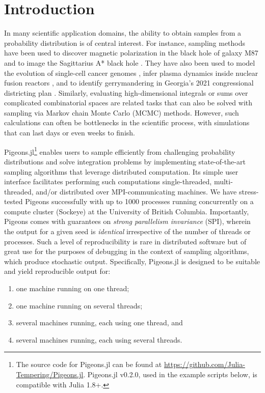 \section{Introduction}
In many scientific application domains, the ability to obtain samples from a 
probability distribution is of central interest. 
For instance, sampling methods have been used to discover magnetic polarization 
in the black hole of galaxy M87 \cite{akiyama2021seven}
and to image the Sagittarius A* black hole \cite{akiyama2022first}.
They have also been used to 
model the evolution of single-cell cancer genomes \cite{salehi2021clonal}, 
infer plasma dynamics inside nuclear fusion reactors \cite{gota2021overview}, 
and to identify gerrymandering in Georgia's 2021 congressional districting plan 
\cite{zhao2022mathematically}.
Similarly, evaluating high-dimensional integrals or sums over complicated 
combinatorial spaces are related tasks that can also be solved with sampling 
via Markov chain Monte Carlo (MCMC) methods. 
However, such calculations can often be bottlenecks in the scientific process, with 
simulations that can last days or even weeks to finish. 


Pigeons.jl\footnote{The source code for Pigeons.jl can be found at 
\url{https://github.com/Julia-Tempering/Pigeons.jl}. 
Pigeons.jl v0.2.0, used in the example scripts below, is compatible with Julia 1.8+.}
enables users to sample efficiently from challenging probability distributions 
and solve integration problems by 
implementing state-of-the-art sampling algorithms \cite{syed2021nrpt,surjanovic2022vpt} 
that leverage distributed computation. Its simple user interface facilitates performing such computations 
single-threaded, multi-threaded, and/or distributed over MPI-communicating machines. 
We have stress-tested Pigeons successfully with up to 1000 processes running 
concurrently on a compute cluster (Sockeye) at the University of British Columbia.
Importantly, Pigeons comes with guarantees on \emph{strong parallelism invariance} (SPI), 
wherein the output for a given seed is \emph{identical} irrespective of the number 
of threads or processes. Such a level of reproducibility is rare in distributed 
software but of great use for the purposes of debugging in the context of sampling 
algorithms, which produce stochastic output.
Specifically, Pigeons.jl is designed to be suitable and yield reproducible output for:
\begin{enumerate}
    \item one machine running on one thread;
    \item one machine running on several threads;
    \item several machines running, each using one thread, and
    \item several machines running, each using several threads.
\end{enumerate}


